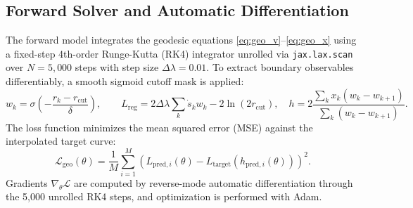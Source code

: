 \documentclass[11pt,a4paper]{article}
\begin{document}
\subsection{Forward Solver and Automatic Differentiation}
The forward model integrates the geodesic equations \eqref{eq:geo_v}--\eqref{eq:geo_x} using a fixed-step 4th-order Runge-Kutta (RK4) integrator unrolled via \texttt{jax.lax.scan} over $N = 5{,}000$ steps with step size $\Delta\lambda = 0.01$. To extract boundary observables differentiably, a smooth sigmoid cutoff mask is applied:
\begin{equation}
    w_k = \sigma\left( -\frac{r_k - r_{\mathrm{cut}}}{\delta} \right), \qquad L_{\mathrm{reg}} = 2 \Delta\lambda \sum_k \dot{s}_k w_k - 2 \ln(2 r_{\mathrm{cut}}), \quad h = 2 \frac{\sum_k x_k (w_k - w_{k+1})}{\sum_k (w_k - w_{k+1})}.
\end{equation}
The loss function minimizes the mean squared error (MSE) against the interpolated target curve:
\begin{equation}
    \mathcal{L}_{\mathrm{geo}}(\theta) = \frac{1}{M} \sum_{i=1}^M \left( L_{\mathrm{pred}, i}(\theta) - L_{\mathrm{target}}(h_{\mathrm{pred}, i}(\theta)) \right)^2.
\end{equation}
Gradients $\nabla_\theta \mathcal{L}$ are computed by reverse-mode automatic differentiation through the 5,000 unrolled RK4 steps, and optimization is performed with Adam.
\end{document}
